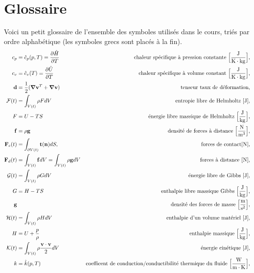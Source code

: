 
\chapter{Glossaire}
  Voici un petit glossaire de l'ensemble des symboles utilisés dans le cours, triés par ordre alphabétique (les symboles grecs sont placés à la fin).
  \begingroup
    \allowdisplaybreaks
    \begin{align*}
      c_p &= \hat{c}_p(p,T) = \pdv{\hat{H}}{T} & \textrm{chaleur spécifique à pression constante } \Big[\si{\frac{J}{K \cdot kg}}\Big],\\
      c_v &= \hat{c}_v (T) = \pdv{\hat{U}}{T} & \textrm{chaleur spécifique à volume constant } \Big[\si{\frac{J}{K \cdot kg}}\Big],\\
      \vb{d} &= \recip{2}(\grad\vb{v}^T + \grad\vb{v}) & \textrm{tenseur taux de déformation},\\
      \mathcal{F}(t) &= \int_{V(t)} \rho F dV & \textrm{entropie libre de Helmholtz } [\si{J}],\\
      F &= U - TS & \textrm{énergie libre massique de Helmholtz } \Big[\si{\frac{J}{kg}}\Big],\\
      \vb{f} &= \rho \vb{g} & \textrm{densité de forces à distance } \Big[\si{\frac{N}{m^3}}\Big], \\
      \mathcal{\vb{F}}_c (t) &= \int_{\partial V(t)} \vb{t}(\vb{n}) dS, & \textrm{forces de contact} [\si{N}],\\
      \mathcal{\vb{F}}_d (t) &= \int_{V(t)} \vb{f} dV = \int_{V(t)} \rho \vb{g} dV & \textrm{forces à distance } [\si{N}],\\
      \mathcal{G}(t) &= \int_{V(t)} \rho G dV & \textrm{énergie libre de Gibbs } [\si{J}],\\
      G &= H -TS & \textrm{enthalpie libre massique Gibbs } \Big[\si{\frac{J}{kg}}\Big],\\
      \vb{g} & & \textrm {densité des forces de masse } \Big[\si{\frac{m}{s^2}}\Big],\\
      \mathcal{H}(t) &= \int_{V(t)} \rho H dV & \textrm{enthalpie d'un volume matériel } [\si{J}],\\
      H &= U + \frac{p}{\rho} & \textrm{enthalpie massique } \Big[\si{\frac{J}{kg}}\Big],\\
      \mathcal{K}(t) &= \int_{V(t)} \rho \frac{\vb{v}\cdot\vb{v}}{2} dV & \textrm{énergie cinétique } [\si{J}],\\
      k &= \hat{k}(p,T) & \textrm{coefficent de conduction/conductibilité thermique du fluide } \Big[\si{\frac{W}{m\cdot K}} \Big],\\

\end{align*}
